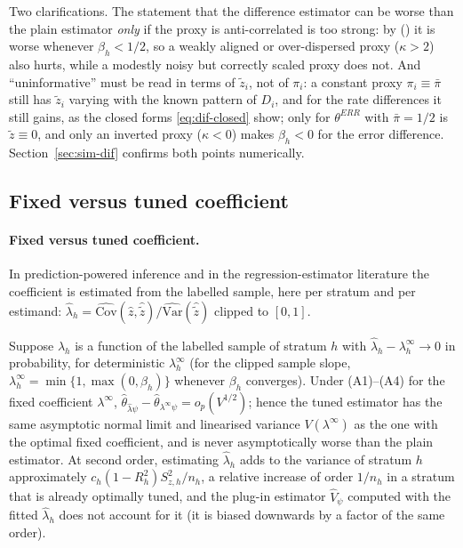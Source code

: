 Two clarifications. The statement that the difference estimator can be worse than the plain estimator \emph{only} if the proxy is anti-correlated is
too strong: by () it is worse whenever $\beta_h<1/2$, so a weakly aligned or over-dispersed
proxy ($\kappa>2$) also hurts, while a modestly noisy but correctly scaled proxy does not. And ``uninformative'' must be read in terms of $\tilde z_i$,
not of $\pi_i$: a constant proxy $\pi_i\equiv\bar\pi$ still has $\tilde z_i$ varying with the known pattern of $D_i$, and for the rate differences
it still gains, as the closed forms \eqref{eq:dif-closed} show; only for $\theta^{ERR}$ with $\bar\pi=1/2$ is $\tilde z\equiv0$, and
only an inverted proxy ($\kappa<0$) makes $\beta_h<0$ for the error difference. Section~\ref{sec:sim-dif} confirms both points numerically.

\subsection{Fixed versus tuned coefficient}\label{si:theory-lambda}

\paragraph{Fixed versus tuned coefficient.} In prediction-powered inference \citep{angelopoulos2026ppipp,fisch2024stratppi} and in the
regression-estimator literature \citep{cassel1976,sarndal1992} the coefficient is estimated from the labelled sample, here
per stratum and per estimand: $\hat\lambda_h=\widehat{\mathrm{Cov}}(\hat z,\hat{\tilde z})/\widehat{\mathrm{Var}}(\hat{\tilde z})$ clipped to $[0,1]$.

\begin{proposition}\label{prop:dif-lambda}
Suppose $\hat\lambda_h$ is a function of the labelled sample of stratum $h$ with $\hat\lambda_h-\lambda^\infty_h\to0$ in probability, for deterministic
$\lambda^\infty_h$ (for the clipped sample slope, $\lambda^\infty_h=\min\{1,\max(0,\beta_h)\}$ whenever $\beta_h$ converges). Under (A1)--(A4)
for the fixed coefficient $\lambda^\infty$, $\hat\theta_{\hat\lambda\psi}-\hat\theta_{\lambda^\infty\psi}=o_p(V^{1/2})$; hence the tuned estimator has the same asymptotic
normal limit and linearised variance $V(\lambda^\infty)$ as the one with the optimal fixed coefficient, and is never asymptotically worse than the plain
estimator. At second order, estimating $\hat\lambda_h$ adds to the variance of stratum $h$ approximately
$c_h(1-R_h^2)S^2_{z,h}/n_h$, a relative increase of order $1/n_h$ in a stratum that is already optimally tuned, and the plug-in estimator $\hat V_\psi$ computed
with the fitted $\hat\lambda_h$ does not account for it (it is biased downwards by a factor of the same order).
\end{proposition}

